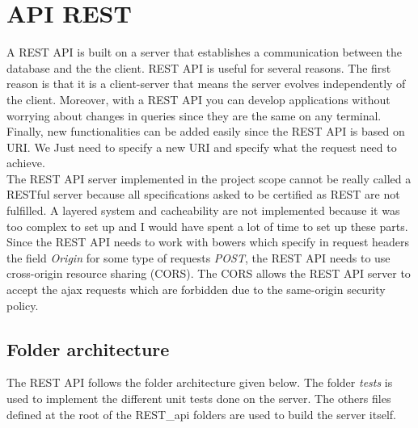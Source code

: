 \section{API REST}
A REST API is built on a server that establishes a communication between the database and the the client. REST API is useful for several reasons. The first reason is that it is a client-server that means the server evolves independently of the client. Moreover, with a REST API you can develop applications without worrying about changes in queries since they are the same on any terminal. Finally, new functionalities can be added easily since the REST API is based on URI. We Just need to specify a new URI and specify what the request need to achieve.\\

The REST API server implemented in the project scope cannot be really called a RESTful server because all specifications asked to be certified as REST are not fulfilled. A layered system and cacheability are not implemented because it was too complex to set up and I would have spent a lot of time to set up these parts.\\

Since the REST API needs to work with bowers which specify in request headers the field \textit{Origin} for some type of requests \textit{POST}, the REST API needs to use cross-origin resource sharing (CORS). The CORS allows the REST API server to accept the ajax requests which are forbidden due to the same-origin security policy.\\

\subsection{Folder architecture}
The REST API follows the folder architecture given below. The folder \textit{tests} is used to implement the different unit tests done on the server. The others files defined at the root of the REST\_api folders are used to build the server itself.


